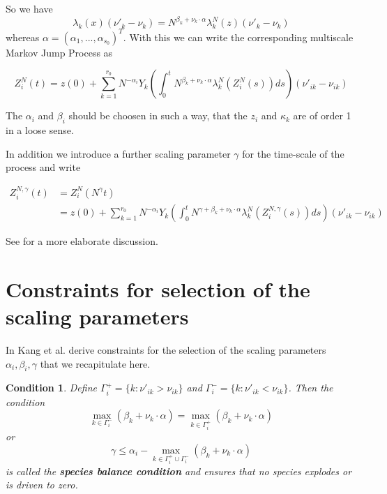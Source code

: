 \documentclass[english]{article}
\begin{document}
\bigskip{}


So we have 
\[
    \lambda_{k} \left(x \right) \left( \nu'_{k} - \nu_{k} \right)
    = N^{\beta_{k} + \nu_{k} \cdot \alpha} \lambda_{k}^{N}
        \left( z \right) \left( \nu'_{k} - \nu_{k} \right)
\]
 whereas $\alpha = \left( \alpha_{1}, ..., \alpha_{s_{0}} \right)^{T}$.
With this we can write the corresponding multiscale Markov Jump
Process as

\[
    Z_{i}^{N}(t) = z(0) + \sum_{k=1}^{r_{0}} N^{-\alpha_{i}} Y_{k}
    \left(
        \int_{0}^{t} N^{\beta_{k}+\nu_{k} \cdot \alpha}
        \lambda_{k}^{N} \left( Z_{i}^{N} \left( s \right) \right) ds
    \right) \left( \nu'_{ik} - \nu_{ik} \right)
\]


The $\alpha_{i}$ and $\beta_{i}$ should be choosen in such a way,
that the $z_{i}$ and $\kappa_{k}$ are of order 1 in a loose sense.

In addition we introduce a further scaling parameter $\gamma$ for
the time-scale of the process and write

\begin{align*}
    Z_{i}^{N, \gamma}(t) & = Z_{i}^{N} \left(N^{\gamma}t \right) \\
    & = z(0) + \sum_{k=1}^{r_{0}} N^{-\alpha_{i}} Y_{k} \left(
            \int_{0}^{t} N^{\gamma + \beta_{k} + \nu_{k} \cdot \alpha}
            \lambda_{k}^{N} \left( Z_{i}^{N, \gamma}
            \left( s \right) \right) ds
        \right) \left( \nu'_{ik} - \nu_{ik} \right)
\end{align*}


See \cite{kang2013separation} for a more elaborate discussion.


\section{Constraints for selection of the scaling parameters}

\label{sec:multiscale_parametrization_constraints}

In \cite{kang2013separation} Kang et al. derive constraints for the
selection of the scaling parameters $\alpha_{i}, \beta_{i},\gamma$
that we recapitulate here.

\newtheorem{condition}{Condition}

\begin{condition}
Define $\Gamma_{i}^{+} = \{ k: \nu'_{ik} > \nu_{ik} \}$ and
$\Gamma_{i}^{-} = \{ k: \nu'_{ik} < \nu_{ik} \}$. Then the condition
\[
    \underset{k \in \Gamma_{i}^{-}}{\max} \left(
        \beta_{k} + \nu_{k} \cdot \alpha
    \right) = \underset{k \in \Gamma_{i}^{+}}{\max} \left(
        \beta_{k} + \nu_{k} \cdot \alpha
    \right)
\]
or
\[
    \gamma \leq \alpha_{i}
    - \underset{k \in \Gamma_{i}^{+} \cup \Gamma_{i}^{-}}{\max} \left(
		\beta_{k} + \nu_{k} \cdot \alpha
	\right)
\]
is called the \textbf{species balance condition} and ensures that no
species explodes or is driven to zero.
\end{condition}
\end{document}
